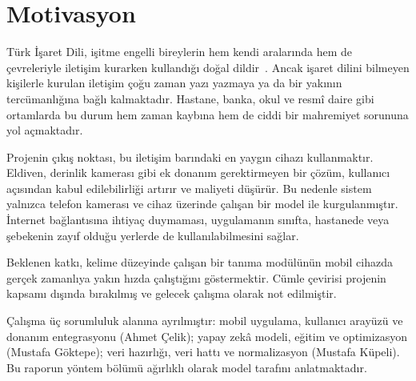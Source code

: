 \section{Motivasyon}
\label{IkinciBolum}

Türk İşaret Dili, işitme engelli bireylerin hem kendi aralarında hem de
çevreleriyle iletişim kurarken kullandığı doğal dildir~\cite{TIF2023}. Ancak
işaret dilini bilmeyen kişilerle kurulan iletişim çoğu zaman yazı yazmaya ya da
bir yakının tercümanlığına bağlı kalmaktadır. Hastane, banka, okul ve resmî
daire gibi ortamlarda bu durum hem zaman kaybına hem de ciddi bir mahremiyet
sorununa yol açmaktadır.

Projenin çıkış noktası, bu iletişim barındaki en yaygın cihazı kullanmaktır.
Eldiven, derinlik kamerası gibi ek donanım gerektirmeyen bir çözüm, kullanıcı
açısından kabul edilebilirliği artırır ve maliyeti düşürür. Bu nedenle sistem
yalnızca telefon kamerası ve cihaz üzerinde çalışan bir model ile kurgulanmıştır.
İnternet bağlantısına ihtiyaç duymaması, uygulamanın sınıfta, hastanede veya
şebekenin zayıf olduğu yerlerde de kullanılabilmesini sağlar.

Beklenen katkı, kelime düzeyinde çalışan bir tanıma modülünün mobil cihazda
gerçek zamanlıya yakın hızda çalıştığını göstermektir. Cümle çevirisi projenin
kapsamı dışında bırakılmış ve gelecek çalışma olarak not edilmiştir.

Çalışma üç sorumluluk alanına ayrılmıştır: mobil uygulama, kullanıcı arayüzü ve
donanım entegrasyonu (Ahmet Çelik); yapay zekâ modeli, eğitim ve optimizasyon
(Mustafa Göktepe); veri hazırlığı, veri hattı ve normalizasyon (Mustafa Küpeli).
Bu raporun yöntem bölümü ağırlıklı olarak model tarafını anlatmaktadır.
